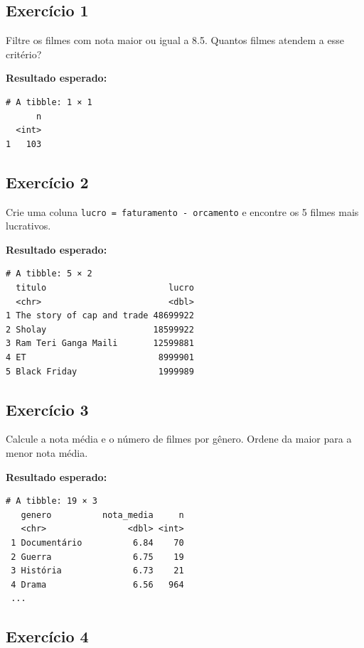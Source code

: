 \documentclass[
  letterpaper,
]{scrbook}
\begin{document}
\subsection{Exercício 1}\label{exercuxedcio-1-4}

Filtre os filmes com nota maior ou igual a 8.5. Quantos filmes atendem a
esse critério?

\textbf{Resultado esperado:}

\begin{verbatim}
# A tibble: 1 × 1
      n
  <int>
1   103
\end{verbatim}

\subsection{Exercício 2}\label{exercuxedcio-2-4}

Crie uma coluna \texttt{lucro\ =\ faturamento\ -\ orcamento} e encontre
os 5 filmes mais lucrativos.

\textbf{Resultado esperado:}

\begin{verbatim}
# A tibble: 5 × 2
  titulo                        lucro
  <chr>                         <dbl>
1 The story of cap and trade 48699922
2 Sholay                     18599922
3 Ram Teri Ganga Maili       12599881
4 ET                          8999901
5 Black Friday                1999989
\end{verbatim}

\subsection{Exercício 3}\label{exercuxedcio-3-3}

Calcule a nota média e o número de filmes por gênero. Ordene da maior
para a menor nota média.

\textbf{Resultado esperado:}

\begin{verbatim}
# A tibble: 19 × 3
   genero          nota_media     n
   <chr>                <dbl> <int>
 1 Documentário          6.84    70
 2 Guerra                6.75    19
 3 História              6.73    21
 4 Drama                 6.56   964
 ...
\end{verbatim}

\subsection{Exercício 4}\label{exercuxedcio-4-1}
\end{document}
